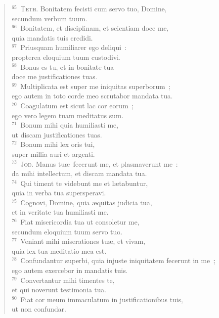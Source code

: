 \begin{flushleft}
\begin{verse}
${}^{65}$~\textsc{Teth.} Bonitatem fecisti cum servo tuo, Domine,\\ secundum verbum tuum.\\
${}^{66}$~Bonitatem, et disciplinam, et scientiam doce me,\\ quia mandatis tuis credidi.\\
${}^{67}$~Priusquam humiliarer ego deliqui~:\\ propterea eloquium tuum custodivi.\\
${}^{68}$~Bonus es tu, et in bonitate tua\\ doce me justificationes tuas.\\
${}^{69}$~Multiplicata est super me iniquitas superborum~;\\ ego autem in toto corde meo scrutabor mandata tua.\\
${}^{70}$~Coagulatum est sicut lac cor eorum~;\\ ego vero legem tuam meditatus sum.\\
${}^{71}$~Bonum mihi quia humiliasti me,\\ ut discam justificationes tuas.\\
${}^{72}$~Bonum mihi lex oris tui,\\ super millia auri et argenti.\\
${}^{73}$~\textsc{Jod.} Manus tu\ae\ fecerunt me, et plasmaverunt me~:\\ da mihi intellectum, et discam mandata tua.\\
${}^{74}$~Qui timent te videbunt me et l\ae tabuntur,\\ quia in verba tua supersperavi.\\
${}^{75}$~Cognovi, Domine, quia \ae quitas judicia tua,\\ et in veritate tua humiliasti me.\\
${}^{76}$~Fiat misericordia tua ut consoletur me,\\ secundum eloquium tuum servo tuo.\\
${}^{77}$~Veniant mihi miserationes tu\ae , et vivam,\\ quia lex tua meditatio mea est.\\
${}^{78}$~Confundantur superbi, quia injuste iniquitatem fecerunt in me~;\\ ego autem exercebor in mandatis tuis.\\
${}^{79}$~Convertantur mihi timentes te,\\ et qui noverunt testimonia tua.\\
${}^{80}$~Fiat cor meum immaculatum in justificationibus tuis,\\ ut non confundar.\\

\end{verse}
\end{flushleft}
